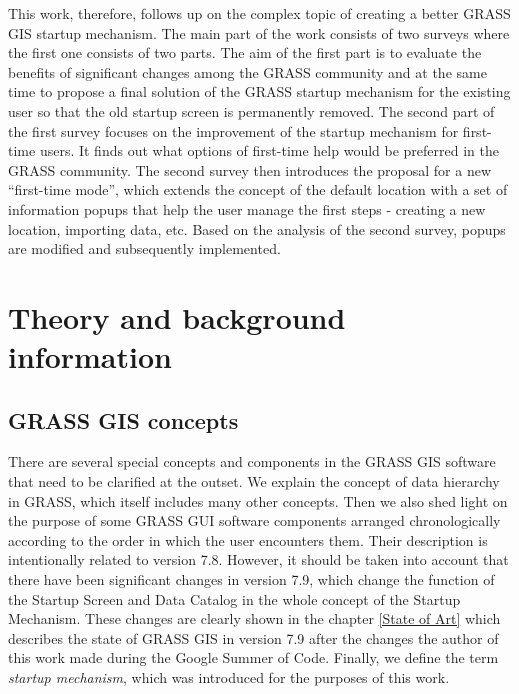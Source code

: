 \documentclass[a4paper,10pt,twoside]{article}
\begin{document}
This work, therefore, follows up on the complex topic of creating a better GRASS GIS startup mechanism. The main part of the work consists of two surveys where the first one consists of two parts. The aim of the first part is to evaluate the benefits of significant changes among the GRASS community and at the same time to propose a final solution of the GRASS startup mechanism for the existing user so that the old startup screen is permanently removed. The second part of the first survey focuses on the improvement of the startup mechanism for first-time users. It finds out what options of first-time help would be preferred in the GRASS community. The second survey then introduces the proposal for a new ``first-time mode'', which extends the concept of the default location with a set of information popups that help the user manage the first steps - creating a new location, importing data, etc. Based on the analysis of the second survey, popups are modified and subsequently implemented.



\newpage
\vspace*{-1cm}
\section{Theory and background information}
\label{section:explanation}

\subsection{GRASS GIS concepts}
\noindent There are several special concepts and components in the GRASS GIS software that need to be clarified at the outset. We explain the concept of data hierarchy in GRASS, which itself includes many other concepts. Then we also shed light on the purpose of some GRASS GUI software components arranged chronologically according to the order in which the user encounters them. Their description is intentionally related to version 7.8. However, it should be taken into account that there have been significant changes in version 7.9, which change the function of the Startup Screen and Data Catalog in the whole concept of the Startup Mechanism. These changes are clearly shown in the chapter \ref{State of Art} which describes the state of GRASS GIS in version 7.9 after the changes the author of this work made during the Google Summer of Code. Finally, we define the term \textit{startup mechanism}, which was introduced for the purposes of this work.
\end{document}
